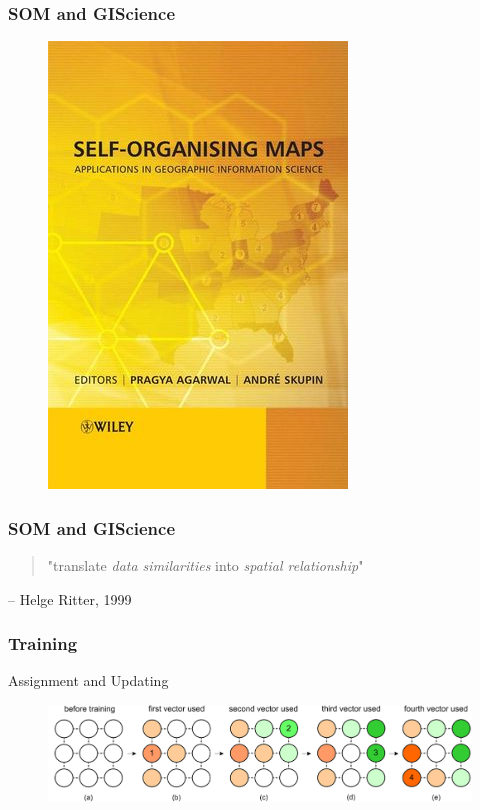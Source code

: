 \documentclass[nototal,handout]{beamer}
\begin{document}
\begin{frame}
	\frametitle{SOM and GIScience}
  \begin{center}
  \begin{figure}
  \includegraphics[width=0.50\linewidth]{book.png}
  \end{figure}
  \end{center}
 \end{frame} 

\begin{frame}
	\frametitle{SOM and GIScience}
  \begin{quote}
  "translate \emph{data similarities} into \emph{spatial relationship}" 
  \end{quote}
  \hspace{2in} -- Helge Ritter, 1999
 \end{frame} 

\begin{frame}
	\frametitle{Training}
 
\begin{block}{Assignment and Updating}
  \begin{center}
  \begin{figure}
  \includegraphics[width=0.90\linewidth]{input.png}
  \end{figure}
  \end{center}
 \end{block} \end{frame} 
\end{document}

